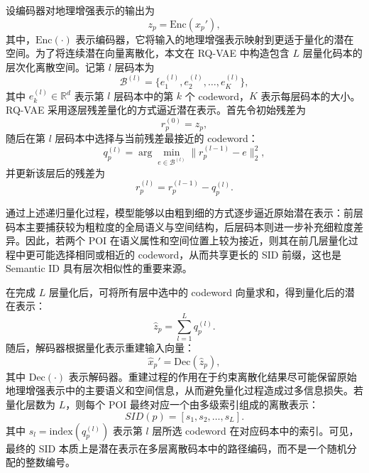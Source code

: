 设编码器对地理增强表示的输出为
\begin{equation}
z_p = \mathrm{Enc}(x_p'),
\end{equation}
其中，$\mathrm{Enc}(\cdot)$ 表示编码器，它将输入的地理增强表示映射到更适于量化的潜在空间。为了将连续潜在向量离散化，本文在 RQ-VAE 中构造包含 $L$ 层量化码本的层次化离散空间。记第 $l$ 层码本为
\begin{equation}
\mathcal{B}^{(l)}=\{e_1^{(l)},e_2^{(l)},\dots,e_K^{(l)}\},
\end{equation}
其中 $e_k^{(l)} \in \mathbb{R}^{d}$ 表示第 $l$ 层码本中的第 $k$ 个 codeword，$K$ 表示每层码本的大小。RQ-VAE 采用逐层残差量化的方式逼近潜在表示。首先令初始残差为
\begin{equation}
r_p^{(0)} = z_p,
\end{equation}
随后在第 $l$ 层码本中选择与当前残差最接近的 codeword：
\begin{equation}
q_p^{(l)}=\arg\min_{e \in \mathcal{B}^{(l)}} \| r_p^{(l-1)}-e \|_2^2,
\end{equation}
并更新该层后的残差为
\begin{equation}
r_p^{(l)} = r_p^{(l-1)} - q_p^{(l)}.
\end{equation}

通过上述递归量化过程，模型能够以由粗到细的方式逐步逼近原始潜在表示：前层码本主要捕获较为粗粒度的全局语义与空间结构，后层码本则进一步补充细粒度差异。因此，若两个 POI 在语义属性和空间位置上较为接近，则其在前几层量化过程中更可能选择相同或相近的 codeword，从而共享更长的 SID 前缀，这也是 Semantic ID 具有层次相似性的重要来源。

在完成 $L$ 层量化后，可将所有层中选中的 codeword 向量求和，得到量化后的潜在表示：
\begin{equation}
\hat{z}_p = \sum_{l=1}^{L} q_p^{(l)}.
\end{equation}
随后，解码器根据量化表示重建输入向量：
\begin{equation}
\hat{x}_p' = \mathrm{Dec}(\hat{z}_p),
\end{equation}
其中 $\mathrm{Dec}(\cdot)$ 表示解码器。重建过程的作用在于约束离散化结果尽可能保留原始地理增强表示中的主要语义和空间信息，从而避免量化过程造成过多信息损失。若量化层数为 $L$，则每个 POI 最终对应一个由多级索引组成的离散表示：
\begin{equation}
SID(p) = [s_1, s_2, \dots, s_L].
\end{equation}
其中 $s_l=\mathrm{index}(q_p^{(l)})$ 表示第 $l$ 层所选 codeword 在对应码本中的索引。可见，最终的 SID 本质上是潜在表示在多层离散码本中的路径编码，而不是一个随机分配的整数编号。

